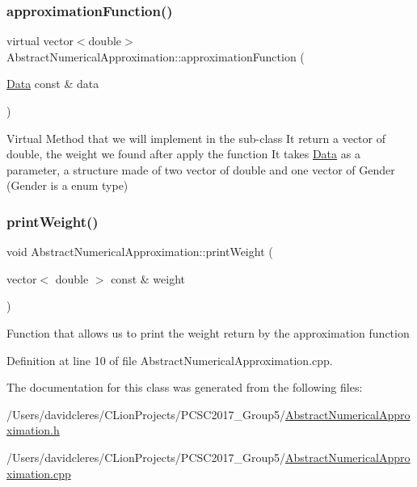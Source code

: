 \subsubsection{\texorpdfstring{approximation\+Function()}{approximationFunction()}}
{\footnotesize\ttfamily virtual vector$<$double$>$ Abstract\+Numerical\+Approximation\+::approximation\+Function (\begin{DoxyParamCaption}\item[{\mbox{\hyperlink{struct_data}{Data}} const \&}]{data }\end{DoxyParamCaption})\hspace{0.3cm}{\ttfamily [pure virtual]}}



Virtual Method that we will implement in the sub-\/class It return a vector of double, the weight we found after apply the function It takes \mbox{\hyperlink{struct_data}{Data}} as a parameter, a structure made of two vector of double and one vector of Gender (Gender is a enum type) 

\mbox{\label{class_abstract_numerical_approximation_a841c83a7ae9f2146001581f3a7f8444a}} 
\subsubsection{\texorpdfstring{print\+Weight()}{printWeight()}}
{\footnotesize\ttfamily void Abstract\+Numerical\+Approximation\+::print\+Weight (\begin{DoxyParamCaption}\item[{vector$<$ double $>$ const \&}]{weight }\end{DoxyParamCaption})}



Function that allows us to print the weight return by the approximation function 



Definition at line 10 of file Abstract\+Numerical\+Approximation.\+cpp.



The documentation for this class was generated from the following files\+:\begin{DoxyCompactItemize}
\item 
/\+Users/davidcleres/\+C\+Lion\+Projects/\+P\+C\+S\+C2017\+\_\+\+Group5/\mbox{\hyperlink{_abstract_numerical_approximation_8h}{Abstract\+Numerical\+Approximation.\+h}}\item 
/\+Users/davidcleres/\+C\+Lion\+Projects/\+P\+C\+S\+C2017\+\_\+\+Group5/\mbox{\hyperlink{_abstract_numerical_approximation_8cpp}{Abstract\+Numerical\+Approximation.\+cpp}}\end{DoxyCompactItemize}
